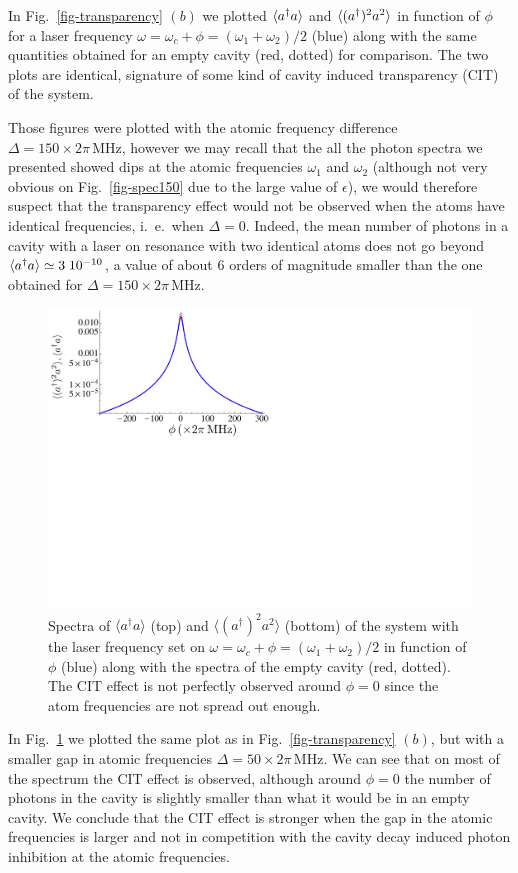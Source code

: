 In Fig.~\ref{fig-transparency} $(b)$ we plotted $\langle a^\dagger a \rangle$ and $\langle (a^\dagger)^2 a^2 \rangle$ in function of $\phi$ for a laser frequency $\omega = \omega_c + \phi = (\omega_1+\omega_2)/2$ (blue) along with the same quantities obtained for an empty cavity (red, dotted) for comparison. The two plots are identical, signature of some kind of cavity induced transparency (CIT) of the system. 

Those figures were plotted with the atomic frequency difference $\Delta=150\times 2\pi\,\mbox{MHz}$, however we may recall that the all the photon spectra we presented showed dips at the atomic frequencies $\omega_1$ and $\omega_2$ (although not very obvious on Fig.~\ref{fig-spec150} due to the large value of $\epsilon$), we would therefore suspect that the transparency effect would not be observed  when the atoms have identical frequencies, i.~e.~when $\Delta=0$. Indeed, the mean number of photons in a cavity with a laser on resonance with two identical atoms does not go beyond $\langle a^\dagger a \rangle \simeq 3 \; 10^{-10}$, a value of about 6 orders of magnitude smaller than the one obtained for $\Delta=150\times 2\pi\,\mbox{MHz}$. 

\begin{figure}
\center
\includegraphics[width=0.65 \textwidth]{Images/chap5/transparency50.pdf}
\caption[$\langle a^\dagger a \rangle$  and $\langle (a^\dagger)^2 a^2 \rangle$ ]{Spectra of $\langle a^\dagger a \rangle$ (top) and $\langle (a^\dagger)^2 a^2 \rangle$ (bottom) of the system with the laser frequency set on $\omega = \omega_c + \phi = (\omega_1+\omega_2)/2$ in function of $\phi$ (blue) along with the spectra of the empty cavity (red, dotted). The CIT effect is not perfectly observed around $\phi=0$ since the atom frequencies are not spread out enough.}
\label{fig-transparency50}
\end{figure}

In Fig.~\ref{fig-transparency50} we plotted the same plot as in Fig.~\ref{fig-transparency} $(b)$, but with a smaller gap in atomic frequencies $\Delta =50 \times 2\pi\,\mbox{MHz}$. We can see that on most of the spectrum the CIT effect is observed, although around $\phi=0$ the number of photons in the cavity is slightly smaller than what it would be in an empty cavity. We conclude that the CIT effect is stronger when the gap in the atomic frequencies is larger and not in competition with the cavity decay induced photon inhibition at the atomic frequencies.

